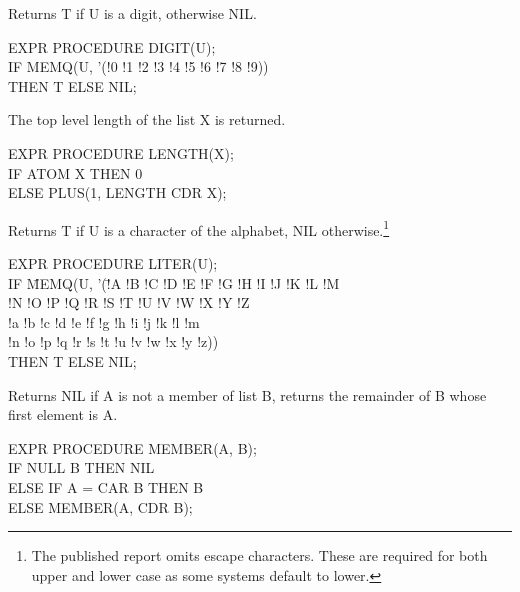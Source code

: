 \documentclass[11pt,letterpaper]{book}
\begin{document}
{Returns T if U is a digit, otherwise NIL.

{\tt \begin{tabbing} EXPR PROCEDURE DIGIT(U); \\
\hspace*{1em} IF MEMQ(U, '(!0 !1 !2 !3 !4 !5 !6 !7 !8 !9)) \\
\hspace*{2em} THEN T ELSE NIL;
\end{tabbing}}}

{The top level length of the list X is returned.

{\tt \begin{tabbing} EXPR PROCEDURE LENGTH(X); \\
\hspace*{1em} IF ATOM X THEN 0 \\
\hspace*{2em} ELSE PLUS(1, LENGTH CDR X);
\end{tabbing}}}

{Returns T if U is a character of the alphabet, NIL
otherwise.\footnote{The published report omits escape characters.
These are required for both upper and lower case as some systems
default to lower.}

{\tt \begin{tabbing} EXPR PROCEDURE LITER(U); \\
\hspace*{1em} IF \= MEMQ(U, '(\=!A !B !C !D !E !F !G !H !I !J !K !L !M \\
\> \> !N !O !P !Q !R !S !T !U !V !W !X !Y !Z \\
\> \> !a !b !c !d !e !f !g !h !i !j !k !l !m \\
\> \> !n !o !p !q !r !s !t !u !v !w !x !y !z)) \\
\> THEN T ELSE NIL;
\end{tabbing}}}

{Returns NIL if A is not a member of list B, returns the remainder of
B whose first element is A. 

{\tt \begin{tabbing} EXPR PROCEDURE MEMBER(A, B); \\
\hspace*{1em} IF NULL B THEN NIL \\
\hspace*{2em} ELSE IF A = CAR B THEN B \\
\hspace*{2em} ELSE MEMBER(A, CDR B);
\end{tabbing}}}
\end{document}
